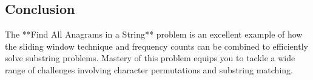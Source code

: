 \subsection*{Conclusion}
The **Find All Anagrams in a String** problem is an excellent example of how the sliding window technique and frequency counts can be combined to efficiently solve substring problems. Mastery of this problem equips you to tackle a wide range of challenges involving character permutations and substring matching.